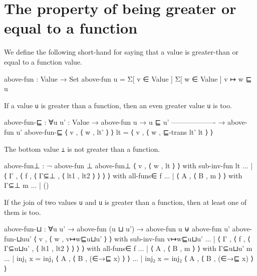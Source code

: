 \hypertarget{the-property-of-being-greater-or-equal-to-a-function}{%
\section{The property of being greater or equal to a
function}\label{the-property-of-being-greater-or-equal-to-a-function}}

We define the following short-hand for saying that a value is
greater-than or equal to a function value.

\begin{fence}
\begin{code}
above-fun : Value → Set
above-fun u = Σ[ v ∈ Value ] Σ[ w ∈ Value ] v ↦ w ⊑ u
\end{code}
\end{fence}

If a value \texttt{u} is greater than a function, then an even greater
value \texttt{u\textquotesingle{}} is too.

\begin{fence}
\begin{code}
above-fun-⊑ : ∀{u u' : Value}
      → above-fun u → u ⊑ u'
        -------------------
      → above-fun u'
above-fun-⊑ ⟨ v , ⟨ w , lt' ⟩ ⟩ lt = ⟨ v , ⟨ w , ⊑-trans lt' lt ⟩ ⟩
\end{code}
\end{fence}

The bottom value \texttt{⊥} is not greater than a function.

\begin{fence}
\begin{code}
above-fun⊥ : ¬ above-fun ⊥
above-fun⊥ ⟨ v , ⟨ w , lt ⟩ ⟩
    with sub-inv-fun lt
... | ⟨ Γ , ⟨ f , ⟨ Γ⊆⊥ , ⟨ lt1 , lt2 ⟩ ⟩ ⟩ ⟩
    with all-funs∈ f
... | ⟨ A , ⟨ B , m ⟩ ⟩
    with Γ⊆⊥ m
... | ()
\end{code}
\end{fence}

If the join of two values \texttt{u} and \texttt{u\textquotesingle{}} is
greater than a function, then at least one of them is too.

\begin{fence}
\begin{code}
above-fun-⊔ : ∀{u u'}
           → above-fun (u ⊔ u')
           → above-fun u ⊎ above-fun u'
above-fun-⊔{u}{u'} ⟨ v , ⟨ w , v↦w⊑u⊔u' ⟩ ⟩
    with sub-inv-fun v↦w⊑u⊔u'
... | ⟨ Γ , ⟨ f , ⟨ Γ⊆u⊔u' , ⟨ lt1 , lt2 ⟩ ⟩ ⟩ ⟩
    with all-funs∈ f
... | ⟨ A , ⟨ B , m ⟩ ⟩
    with Γ⊆u⊔u' m
... | inj₁ x = inj₁ ⟨ A , ⟨ B , (∈→⊑ x) ⟩ ⟩
... | inj₂ x = inj₂ ⟨ A , ⟨ B , (∈→⊑ x) ⟩ ⟩
\end{code}
\end{fence}

